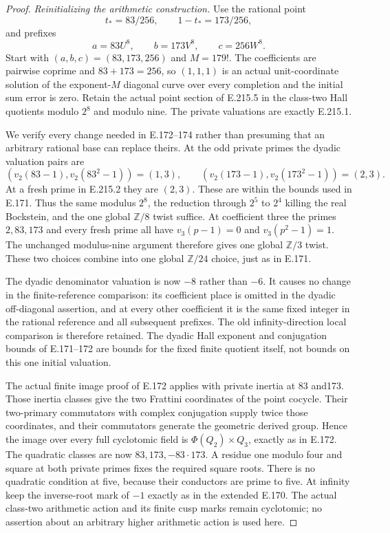 \begin{proof}
\emph{Reinitializing the arithmetic construction.}
Use the rational point
\[
              t_*=83/256,\qquad1-t_*=173/256,
 \tag{E.215.5}
\]
and prefixes
\[
              a=83U^8,\qquad b=173V^8,\qquad c=256W^8.
 \tag{E.215.6}
\]
Start with $(a,b,c)=(83,173,256)$ and $M=179!$. The coefficients
are pairwise coprime and $83+173=256$, so $(1,1,1)$ is an actual
unit-coordinate solution of the exponent-$M$ diagonal curve over every
completion and the initial sum error is zero. Retain the actual point
section of E.215.5 in the class-two Hall quotients modulo $2^8$ and
modulo nine. The private valuations are exactly E.215.1.

We verify every change needed in E.172--174 rather than presuming that
an arbitrary rational base can replace theirs. At the odd private
primes the dyadic valuation pairs are
\[
 (v_2(83-1),v_2(83^2-1))=(1,3),\qquad
 (v_2(173-1),v_2(173^2-1))=(2,3).
 \tag{E.215.7}
\]
At a fresh prime in E.215.2 they are $(2,3)$. These are within the
bounds used in E.171. Thus the same modulus $2^8$, the reduction through
$2^5$ to $2^4$ killing the real Bockstein, and the one global
$\mathbb Z/8$ twist suffice. At coefficient three the primes
$2,83,173$ and every fresh prime all have
$v_3(p-1)=0$ and $v_3(p^2-1)=1$. The unchanged modulus-nine argument
therefore gives one global $\mathbb Z/3$ twist. These two choices combine
into one global $\mathbb Z/24$ choice, just as in E.171.

The dyadic denominator valuation is now $-8$ rather than $-6$.
It causes no change in the finite-reference comparison: its coefficient
place is omitted in the dyadic off-diagonal assertion, and at every other
coefficient it is the same fixed integer in the rational reference and
all subsequent prefixes. The old infinity-direction local comparison is
therefore retained. The dyadic Hall exponent and conjugation bounds of
E.171--172 are bounds for the fixed finite quotient itself, not bounds
on this one initial valuation.

The actual finite image proof of E.172 applies with private inertia at
83 and173. Those inertia classes give the two Frattini coordinates of
the point cocycle. Their two-primary commutators with complex conjugation
supply twice those coordinates, and their commutators generate the
geometric derived group. Hence the image over every full cyclotomic
field is $\Phi(Q_2)\times Q_3$, exactly as in E.172. The quadratic
classes are now $83,173,-83\cdot173$. A residue one modulo four and
square at both private primes fixes the required square roots. There
is no quadratic condition at five, because their conductors are prime
to five. At infinity keep the inverse-root mark of $-1$ exactly as in
the extended E.170. The actual class-two arithmetic action and its
finite cusp marks remain cyclotomic; no assertion about an arbitrary
higher arithmetic action is used here.


\end{proof}
